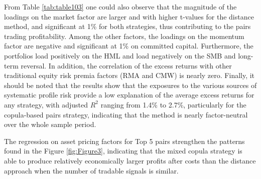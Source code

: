 	From Table \ref{tab:table103} one could also observe that the magnitude of the loadings on the market factor are larger and with higher t-values for the distance method, and significant at 1\% for both strategies, thus contributing to the pairs trading profitability. Among the other factors, the loadings on the momentum factor are negative and significant at 1\% on committed capital. Furthermore, the portfolios load positively on the HML and load negatively on the SMB and long-term reversal. In addition, the correlation of the excess returns with other traditional equity risk premia factors (RMA and CMW) is nearly zero. Finally, it should be noted that the results show that the exposures to the various sources of systematic profile risk provide a low explanation of the average excess returns for any strategy, with adjusted $R^2$ ranging from  1.4\% to 2.7\%, particularly for the copula-based pairs strategy, indicating that the method is nearly factor-neutral over the whole sample period.
	
 The regression on asset pricing factors for Top 5 pairs strengthen the patterns found in the Figure \ref{fig:Figure3}, indicating that the mixed copula strategy is able to produce relatively economically larger profits after costs than the distance approach when the number of tradable signals is similar. 

